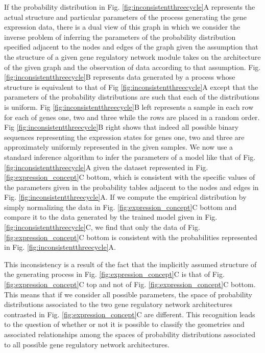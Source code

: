 If the probability distribution in Fig. \ref{fig:inconsistentthreecycle}A represents the actual structure and particular parameters of the process generating the gene expression data, there is a dual view of this graph in which we consider the inverse problem of inferring the parameters of the probability distribution specified adjacent to the nodes and edges of the graph given the assumption that the structure of a given gene regulatory network module takes on the architecture of the given graph and the observation of data according to that assumption. Fig. \ref{fig:inconsistentthreecycle}B represents data generated by a process whose structure is equivalent to that of Fig \ref{fig:inconsistentthreecycle}A except that the parameters of the probability distributions are such that each of the distributions is uniform. Fig \ref{fig:inconsistentthreecycle}B left represents a sample in each row for each of genes one, two and three while the rows are placed in a random order. Fig \ref{fig:inconsistentthreecycle}B right shows that indeed all possible binary sequences representing the expression states for genes one, two and three are approximately uniformly represented in the given samples. We now use a standard inference algorithm to infer the parameters of a model like that of Fig. \ref{fig:inconsistentthreecycle}A given the dataset represented in Fig. \ref{fig:expression_concept}C bottom, which is consistent with the specific values of the parameters given in the probability tables adjacent to the nodes and edges in Fig. \ref{fig:inconsistentthreecycle}A. If we compute the empirical distribution by simply normalizing the data in Fig. \ref{fig:expression_concept}C bottom and compare it to the data generated by the trained model given in Fig. \ref{fig:inconsistentthreecycle}C, we find that only the data of Fig. \ref{fig:expression_concept}C bottom is consistent with the probabilities represented in Fig. \ref{fig:inconsistentthreecycle}A.

This inconsistency is a result of the fact that the implicitly assumed structure of the generating process in Fig. \ref{fig:expression_concept}C is that of Fig. \ref{fig:expression_concept}C top and not of Fig. \ref{fig:expression_concept}C bottom. This means that if we consider all possible parameters, the space of probability distributions associated to the two gene regulatory network architectures contrasted in Fig. \ref{fig:expression_concept}C are different. This recognition leads to the question of whether or not it is possible to classify the geometries and associated relationships among the spaces of probability distributions associated to all possible gene regulatory network architectures.

